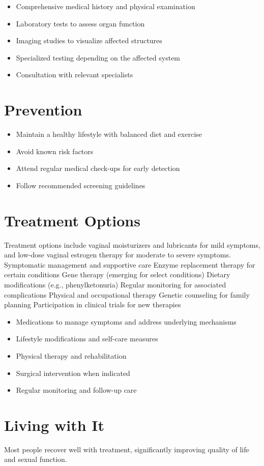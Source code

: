 \begin{itemize}[noitemsep]
  \item Comprehensive medical history and physical examination
  \item Laboratory tests to assess organ function
  \item Imaging studies to visualize affected structures
  \item Specialized testing depending on the affected system
  \item Consultation with relevant specialists
\end{itemize}
\section{Prevention}
\begin{itemize}[noitemsep]
  \item Maintain a healthy lifestyle with balanced diet and exercise
  \item Avoid known risk factors
  \item Attend regular medical check-ups for early detection
  \item Follow recommended screening guidelines
\end{itemize}
\section{Treatment Options}
Treatment options include vaginal moisturizers and lubricants for mild symptoms, and low-dose vaginal estrogen therapy for moderate to severe symptoms. Symptomatic management and supportive care Enzyme replacement therapy for certain conditions Gene therapy (emerging for select conditions) Dietary modifications (e.g., phenylketonuria) Regular monitoring for associated complications Physical and occupational therapy Genetic counseling for family planning Participation in clinical trials for new therapies

\begin{itemize}[noitemsep]
  \item Medications to manage symptoms and address underlying mechanisms
  \item Lifestyle modifications and self-care measures
  \item Physical therapy and rehabilitation
  \item Surgical intervention when indicated
  \item Regular monitoring and follow-up care
\end{itemize}
\section{Living with It}
Most people recover well with treatment, significantly improving quality of life and sexual function.

